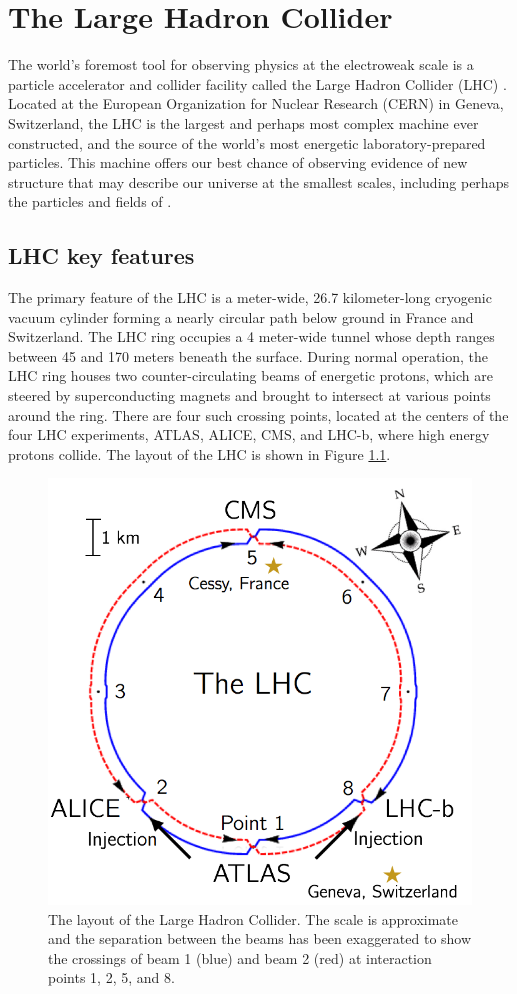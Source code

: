 \chapter{The Large Hadron Collider}
\label{chap:lhc}
The world's foremost tool for observing physics at the electroweak scale is a particle accelerator and collider facility called the Large Hadron Collider (LHC) \cite{Breskin:1244506}. Located at the European Organization for Nuclear Research (CERN) in Geneva, Switzerland, the LHC is the largest and perhaps most complex machine ever constructed, and the source of the world's most energetic laboratory-prepared particles. This machine offers our best chance of observing evidence of new structure that may describe our universe at the smallest scales, including perhaps the particles and fields of \SUSY.

\section{LHC key features}
The primary feature of the LHC is a meter-wide, 26.7 kilometer-long cryogenic vacuum cylinder forming a nearly circular path below ground in France and Switzerland. The LHC ring occupies a 4 meter-wide tunnel whose depth ranges between 45 and 170 meters beneath the surface. During normal operation, the LHC ring houses two counter-circulating beams of energetic protons, which are steered by superconducting magnets and brought to intersect at various points around the ring. There are four such crossing points, located at the centers of the four LHC experiments, ATLAS, ALICE, CMS, and LHC-b, where high energy protons collide. The layout of the LHC is shown in Figure \ref{fig:LHCLayout}. 

\begin{figure}[t]
\centering
\includegraphics[width=.75\linewidth]{figures/LHC/LHC.png}
\caption{The layout of the Large Hadron Collider. The scale is approximate and the separation between the beams has been exaggerated to show the crossings of beam 1 (blue) and beam 2 (red) at interaction points 1, 2, 5, and 8.} 
\label{fig:LHCLayout}
\end{figure}

